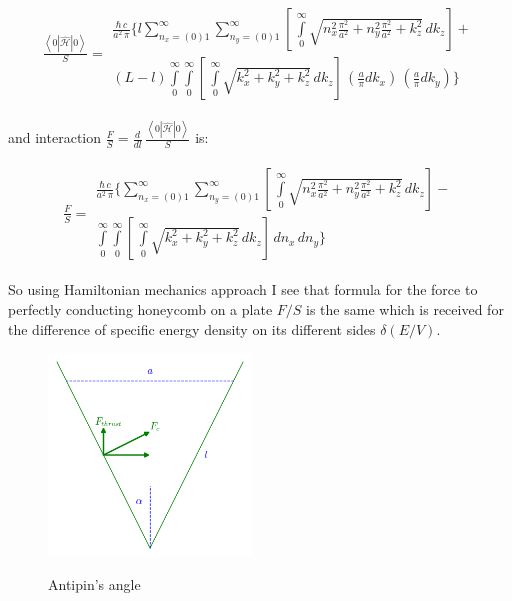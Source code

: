 \documentclass[11pt]{article}
\begin{document}
\[\begin{array}{lr}
\frac{\left<0|\hat{\mathcal{H}}|0\right>}{S} =
\begin{array}{c}\frac{\hbar\,c}{a^2\,\pi}\Bigg\{l\sum\limits_{n_x=(0)1}^{\infty}\sum\limits_{n_y=(0)1}^{\infty}\left[\,\int\limits_{0}^{\infty}\sqrt{n_x^2\frac{\pi^2}{a^2}+n_y^2\frac{\pi^2}{a^2}+k_z^2}\,dk_z\right] + \\
(L-l)\int\limits_{0}^{\infty}\int\limits_{0}^{\infty}\left[\,\int\limits_{0}^{\infty}\sqrt{k_x^2+k_y^2+k_z^2}\,dk_z\right]\,\left(\frac{a}{\pi}dk_x\right)\,\left(\frac{a}{\pi}dk_y\right)\Bigg\}
\end{array}\end{array}\]

and interaction
\(\frac{F}{S} = \frac{d}{dl} \,\frac{\left<0|\hat{\mathcal{H}}|0\right>}{S}\)
is:

\[\begin{array}{lr}\frac{F}{S} =
\begin{array}{c}\frac{\hbar\,c}{a^2\,\pi}\Bigg\{\sum\limits_{n_x=(0)1}^{\infty}\sum\limits_{n_y=(0)1}^{\infty}\left[\,\int\limits_{0}^{\infty}\sqrt{n_x^2\frac{\pi^2}{a^2}+n_y^2\frac{\pi^2}{a^2}+k_z^2}\,dk_z\right] - \\
\int\limits_{0}^{\infty}\int\limits_{0}^{\infty}\left[\,\int\limits_{0}^{\infty}\sqrt{k_x^2+k_y^2+k_z^2}\,dk_z\right]\,dn_x\,dn_y\Bigg\}\end{array}\end{array}\]

    So using Hamiltonian mechanics approach I see that formula for the force
to perfectly conducting honeycomb on a plate \({F}/{S}\) is the same
which is received for the difference of specific energy density on its
different sides \(\delta\left({E}/{V}\right)\).

    \begin{figure}
\begin{center}
\includegraphics[width=0.48\textwidth]{Antipins_angle_en.png}
\caption{}{Antipin's angle}
\end{center}
\label{fig:Antipins_angle}
\end{figure}
\end{document}
